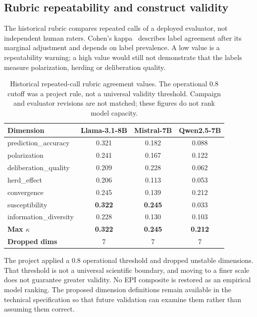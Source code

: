 \subsection{Rubric repeatability and construct validity}
\label{sec:evaluator_reliability}
The historical rubric compares repeated calls of a deployed evaluator, not independent human raters. Cohen's kappa~\cite{cohen1960} describes label agreement after its marginal adjustment and depends on label prevalence. A low value is a repeatability warning; a high value would still not demonstrate that the labels measure polarization, herding or deliberation quality.
\begin{table}[!htbp]
\centering
\caption{Historical repeated-call rubric agreement values. The operational 0.8 cutoff was a project rule, not a universal validity threshold. Campaign and evaluator revisions are not matched; these figures do not rank model capacity.}
\label{tab:kappa_summary}
\small
\begin{tabular}{lccc}
\toprule
\textbf{Dimension} & \textbf{Llama-3.1-8B} & \textbf{Mistral-7B} & \textbf{Qwen2.5-7B} \\
\midrule
prediction\_accuracy    & 0.321 & 0.182 & 0.088 \\
polarization           & 0.241 & 0.167 & 0.122 \\
deliberation\_quality  & 0.209 & 0.228 & 0.062 \\
herd\_effect           & 0.206 & 0.113 & 0.053 \\
convergence            & 0.245 & 0.139 & 0.212 \\
susceptibility         & \textbf{0.322} & \textbf{0.245} & 0.033 \\
information\_diversity & 0.228 & 0.130 & 0.103 \\
\midrule
\textbf{Max $\kappa$}  & \textbf{0.322} & \textbf{0.245} & \textbf{0.212} \\
\textbf{Dropped dims}  & 7 & 7 & 7 \\
\bottomrule
\end{tabular}
\setlength{\tabcolsep}{6pt}
\end{table}

The project applied a 0.8 operational threshold and dropped unstable dimensions. That threshold is not a universal scientific boundary, and moving to a finer scale does not guarantee greater validity. No EPI composite is restored as an empirical model ranking. The proposed dimension definitions remain available in the technical specification so that future validation can examine them rather than assuming them correct.

